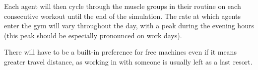 \documentclass[9pt]{pnas-new}
\begin{document}

Each agent will then cycle through the muscle groups in their routine on each consecutive workout until the end of the simulation.
The rate at which agents enter the gym will vary throughout the day, with a peak during the evening hours (this peak should be especially pronounced on work days).

There will have to be a built-in preference for free machines even if it means greater travel distance, as working in with someone is usually left as a last resort.




\showacknow %


\begin{multicols}{2}
\section*{\bibname}

\end{multicols}
\end{document}

